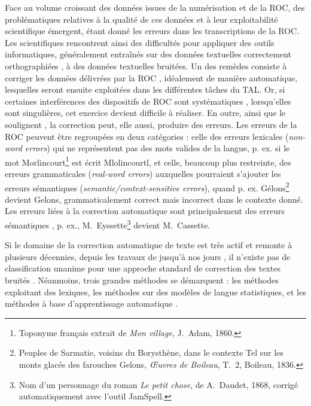 Face au volume croissant des données issues de la numérisation et de la ROC, des problématiques relatives à la qualité de ces données et à leur exploitabilité scientifique émergent, étant donné 
les erreurs dans les transcriptions de la ROC. Les scientifiques rencontrent ainsi des difficultés pour appliquer des outils informatiques, généralement entraînés sur des données textuelles correctement orthographiées \cite{DBLP:journals/corr/EshelCRMYL17}, à des données textuelles bruitées. Un des remèdes consiste à corriger les données délivrées par la ROC \cite{DBLP:conf/taln/SagotG14}, idéalement de manière automatique, lesquelles seront ensuite exploitées dans les différentes tâches du TAL. Or, si certaines interférences des dispositifs de ROC sont systématiques \cite{stanislawek-2019}, lorsqu’elles sont singulières, cet exercice devient difficile à réaliser. En outre, ainsi que le soulignent , la correction peut, elle aussi, produire des erreurs. 
Les erreurs de la ROC peuvent être regroupées en deux catégories \cite{oger} : celle des erreurs lexicales (\textit{non-word errors}) qui ne représentent pas des mots valides de la langue, p. ex. si le mot \og{}Morlincourt\fg{}\footnote{Toponyme français extrait de \textit{Mon village}, J.\ Adam, 1860.} est écrit \og{}Mlolincourtl\fg{}, et celle, beaucoup plus restreinte, des erreurs grammaticales (\textit{real-word errors}) \cite{wisniewski} auxquelles pourraient s'ajouter les erreurs sémantiques (\textit{semantic/context-sensitive errors}), quand p. ex. \og{}Gélons\fg{}\footnote{Peuples de Sarmatie, voisins du Borysthène, dans le contexte  \og{}Tel sur les monts glacés des farouches Gelons\fg{}, \textit{Œuvres de Boileau}, T.\ 2, Boileau, 1836.} devient \og{}Gelons\fg{}, grammaticalement correct mais incorrect dans le contexte donné. Les erreurs liées à la correction automatique sont principalement des erreurs sémantiques \cite{azmi}, p. ex., \og{}M.\ Eyssette\fg{}\footnote{Nom d’un personnage du roman \textit{Le petit chose}, de A.\ Daudet, 1868, corrigé automatiquement avec l'outil JamSpell.} devient \og{}M.\ Cassette\fg{}. 

Si le domaine de la correction automatique de texte est très actif et remonte à plusieurs décennies, depuis les travaux de  jusqu’à nos jours \cite{nguyen2021}, il n’existe pas de classification unanime pour une approche standard de correction des textes bruités \cite{DBLP:journals/corr/abs-1203-5255,dumasmilneedwards:tel-01562039,Nguyen-2020}. %
Néanmoins, trois grandes méthodes se démarquent : les méthodes exploitant des lexiques, les méthodes sur des modèles de langue statistiques, et les méthodes à base d’apprentissage automatique \cite{petkovic2022impact}. 

